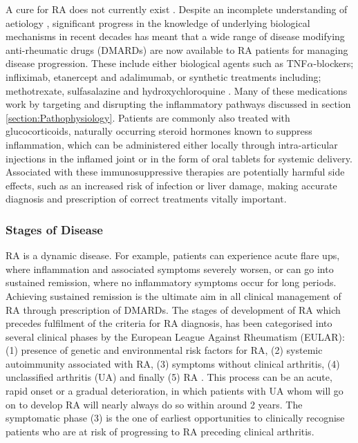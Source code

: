 \documentclass[twoside]{bhamthesis}
\theoremstyle{definition}
\begin{document}
A cure for RA does not currently exist \cite{el2002we}. Despite an incomplete understanding of aetiology \cite{el2002we}, significant progress in the knowledge of underlying biological mechanisms in recent decades has meant that a wide range of disease modifying anti-rheumatic drugs (DMARDs) are now available to RA patients for managing disease progression. These include either biological agents such as TNF$\alpha$-blockers; infliximab, etanercept and adalimumab, or synthetic treatments including; methotrexate, sulfasalazine and hydroxychloroquine \cite{smolen2010eular}. Many of these medications work by targeting and disrupting the inflammatory pathways discussed in section \ref{section:Pathophysiology}. Patients are commonly also treated with glucocorticoids, naturally occurring steroid hormones known to suppress inflammation, which can be administered either locally through intra-articular injections in the inflamed joint or in the form of oral tablets for systemic delivery. Associated with these immunosuppressive therapies are potentially harmful side effects, such as an increased risk of infection or liver damage, making accurate diagnosis and prescription of correct treatments vitally important.

\subsubsection{Stages of Disease}

RA is a dynamic disease. For example, patients can experience acute flare ups, where inflammation and associated symptoms severely worsen, or can go into sustained remission, where no inflammatory symptoms occur for long periods. Achieving sustained remission is the ultimate aim in all clinical management of RA through prescription of DMARDs. The stages of development of RA which precedes fulfilment of the criteria for RA diagnosis, has been categorised into several clinical phases by the European League Against Rheumatism (EULAR): (1) presence of genetic and environmental risk factors for RA, (2) systemic autoimmunity associated with RA, (3) symptoms without clinical arthritis, (4) unclassified arthritis (UA) and finally (5) RA \cite{gerlag2012eular}. This process can be an acute, rapid onset or a gradual deterioration, in which patients with UA whom will go on to develop RA will nearly always do so within around 2 years. The symptomatic phase (3) is the one of earliest opportunities to clinically recognise patients who are at risk of progressing to RA preceding clinical arthritis. 
\end{document}
